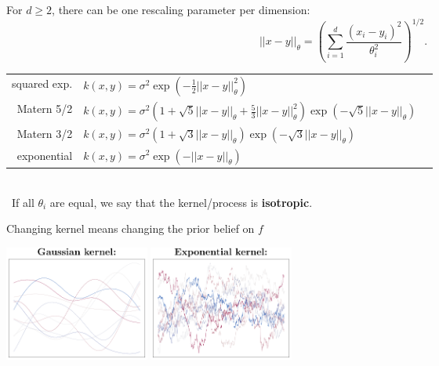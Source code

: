 \documentclass{beamer}
\newcommand\Ni[2]{{|| #1 ||}_{\! #2}}
\begin{document}
\begin{frame}{}
For $d \geq 2$, there can be one rescaling parameter per dimension:
\begin{equation*}
  \Ni{x-y}{\theta} = \left( \sum_{i=1}^d \frac{(x_i-y_i)^2}{\theta_i^2} \right)^{1/2}.
\end{equation*}
\vspace{2mm}
\scriptsize
\begin{tabular}{rlN}
        squared exp. & $\displaystyle k(x,y) = \sigma^2 \exp \left(- \frac12 \Ni{x-y}{\theta}^2 \right)$ &\\[6mm]
        Matern 5/2 & $\displaystyle k(x,y) = \sigma^2 \left(1 + \sqrt{5}\Ni{x-y}{\theta} + \frac{5}{3}\Ni{x-y}{\theta}^2 \right) \exp \left(- \sqrt{5}\Ni{x-y}{\theta} \right)$ &\\[6mm]
        Matern 3/2 & $\displaystyle k(x,y) = \sigma^2 \left(1 + \sqrt{3}\Ni{x-y}{\theta} \right) \exp \left(- \sqrt{3}\Ni{x-y}{\theta}  \right)$ &\\[6mm]
        exponential & $\displaystyle k(x,y) = \sigma^2 \exp \left(- \Ni{x-y}{\theta} \right)$ 
\end{tabular}
\normalsize
\\ \vspace{5mm} \
If all $\theta_i$ are equal, we say that the kernel/process is \textbf{isotropic}.
\end{frame}


\begin{frame}{}
Changing kernel means changing the prior belief on $f$\\ 
\begin{center}
\includegraphics[height=3.8cm]{figures/R/Fig2-sim-rbf} \qquad 
\includegraphics[height=3.8cm]{figures/R/Fig2-sim-exp}
\end{center}
\end{frame}
\end{document}
